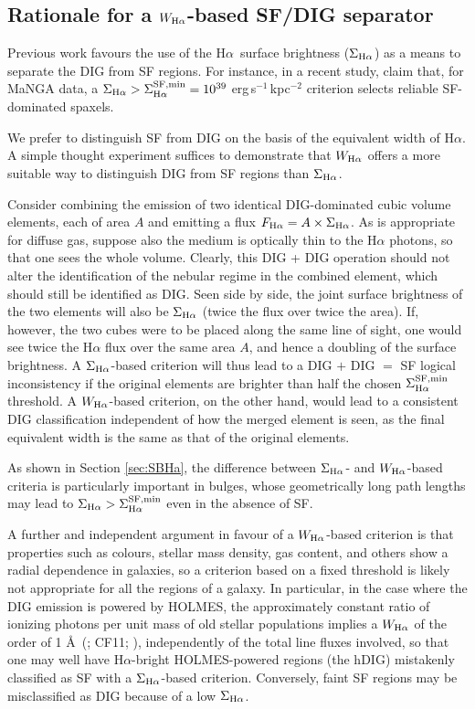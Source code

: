 \documentclass[a4paper, fleqn, usenatbib, useAMS]{mnras}
\newcommand{\Ha}{\ifmmode {\rm H}\alpha \else H$\alpha$\fi\xspace}
\begin{document}
\subsection{Rationale for a $W_{\Ha}$-based SF/DIG separator}
\label{sec:WHaRationale}

Previous work favours the use of the \Ha\ surface brightness ($\Sigma_{\Ha}$) as a means to separate the DIG from SF regions. For instance, in a recent study, \cite{Zhang.etal.2017a} claim that, for MaNGA \cite{Bundy.etal.2015} data, a $\Sigma_{\Ha} > \Sigma_{\Ha}^{\rm SF,min} = 10^{39}$ erg$\,$s$^{-1}\,$kpc$^{-2}$ criterion selects reliable SF-dominated spaxels.

We prefer to distinguish SF from DIG  on the basis of the equivalent width of \Ha. A simple thought experiment suffices to demonstrate that $W_{\Ha}$ offers a more suitable way to distinguish DIG from SF regions than $\Sigma_{\Ha}$.

Consider combining the emission of two identical DIG-dominated cubic volume elements, each of area  $A$ and emitting a flux $F_{\Ha} = A \times \Sigma_{\Ha}$. As is appropriate for diffuse gas, suppose also the medium is optically thin to the \Ha photons, so that one sees the whole volume. Clearly, this DIG + DIG operation should not alter the identification of the nebular regime in the combined element, which should still be identified as DIG. Seen side by side, the joint surface brightness of the two elements will also be $\Sigma_{\Ha}$ (twice the flux over twice the area). If, however, the two cubes were to be placed along the same line of sight, one would see twice the \Ha flux over the same area $A$, and hence a doubling of the surface brightness. A $\Sigma_{\Ha}$-based criterion will thus lead to a DIG $+$ DIG $=$ SF logical inconsistency if the original elements are brighter than half the chosen $\Sigma_{\Ha}^{\rm SF, min}$ threshold. A $W_{\Ha}$-based criterion, on the other hand, would lead to a consistent DIG classification independent of how the merged element is seen, as the final equivalent width is the same as that of the original elements.

As shown in Section \ref{sec:SBHa}, the difference between $\Sigma_{\Ha}$- and $W_{\Ha}$-based criteria is particularly important in bulges, whose geometrically long path lengths may lead to $\Sigma_{\Ha} > \Sigma_{\Ha}^{\rm SF, min}$  even in the absence of SF.

A further and independent argument in favour of a $W_{\Ha}$-based criterion is that properties such as colours, stellar mass density, gas content, and others show a radial dependence in galaxies, so a criterion based on a fixed threshold is likely not  appropriate for all the regions of a galaxy. In particular, in the case  where the DIG emission is powered by HOLMES, the approximately constant ratio of ionizing photons per unit mass of old stellar populations implies a $W_{\Ha}$ of the order of 1 \AA\ (\citealt{Binette.etal.1994a}; CF11; \citealt{Belfiore.etal.2016}), independently of the total line fluxes involved, so that one may well have \Ha-bright HOLMES-powered regions (the hDIG) mistakenly classified as SF with a $\Sigma_{\Ha}$-based criterion. Conversely, faint SF regions may be misclassified as DIG because of a low $\Sigma_{\Ha}$.
\end{document}

